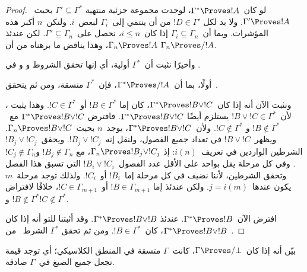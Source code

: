 \documentclass[../../../include/open-logic-section]{subfiles}
\begin{document}
\begin{proof}
  لو كان~$\Gamma^* \Proves !A$، لوجدت مجموعة جزئية منتهية
  $\Gamma'\subseteq\Gamma^*$ بحيث~$\Gamma'\Proves !A$. ولا بد لكل
  $!D\in\Gamma'$ من أن ينتمي إلى~$\Gamma_i$ لبعض~$i$. ولتكن~$n$ أكبر
  هذه المؤشرات. وبما أن~$\Gamma_i\subseteq\Gamma_n$ إذا كان~$i\leq n$،
  نحصل على~$\Gamma'\subseteq\Gamma_n$. لكن عندئذ
  $\Gamma_n\Proves !A$، وهذا يناقض ما برهناه من أن
  $\Gamma_n\Proves/!A$.

  وأخيرًا نثبت أن~$\Gamma^*$ أولية، أي إنها تحقق الشروط
   و و في
  .

  أولًا، بما أن~$\Gamma^*\Proves/!A$، فإن~$\Gamma^*$ متسقة، ومن ثم
  يتحقق~.

  ونثبت الآن أنه إذا كان~$\Gamma^*\Proves !B\lor !C$، كان إما
  $!B\in\Gamma^*$ أو~$!C\in\Gamma^*$. وهذا يثبت
  ، لأن~$!B\lor !C\in\Gamma^*$ يستلزم أيضًا
  $\Gamma^*\Proves !B\lor !C$. فافترض
  $\Gamma^*\Proves !B\lor !C$ مع~$!B\notin\Gamma^*$ و
  $!C\notin\Gamma^*$. ولأن~$\Gamma^*\Proves !B\lor !C$، يوجد~$n$
  بحيث~$\Gamma_n\Proves !B\lor !C$. ويظهر~$!B\lor !C$ في تعداد جميع
  الفصول، ولنقل إنه~$!B_j\lor !C_j$. ويحقق~$!B_j\lor !C_j$ الشرطين
  الواردين في تعريف~$i(n)$: إذ
  $\Gamma_n\Proves !B_j\lor !C_j$، مع
  $!B_j\notin\Gamma_n$ و$!C_j\notin\Gamma_n$. وفي كل مرحلة يقل بواحد
  على الأقل عدد الفصول~$!B_i\lor !C_i$ التي تسبق هذا الفصل وتحقق
  الشرطين، لأننا نضيف في كل مرحلة إما~$!B_i$ أو~$!C_i$. ولذلك توجد
  مرحلة~$m$ يكون عندها~$j=i(m)$. ولكن عندئذ إما
  $!B\in\Gamma_{m+1}$ أو~$!C\in\Gamma_{m+1}$، خلافًا لافتراض
  $!B\notin\Gamma^*$ و$!C\notin\Gamma^*$.

  افترض الآن~$\Gamma^*\Proves !B$. عندئذ
  $\Gamma^*\Proves !B\lor !B$. وقد أثبتنا للتو أنه إذا كان
  $\Gamma^*\Proves !B\lor !B$، كان~$!B\in\Gamma^*$. ومن ثم تحقق
  $\Gamma^*$ الشرط~ من~.
\end{proof}

\begin{prob}
بيّن أنه إذا كان~$\Gamma \Proves/ \bot$، كانت~$\Gamma$ متسقة في
المنطق الكلاسيكي؛ أي توجد قيمة تجعل جميع الصيغ في~$\Gamma$ صادقة.
\end{prob}
\end{document}
